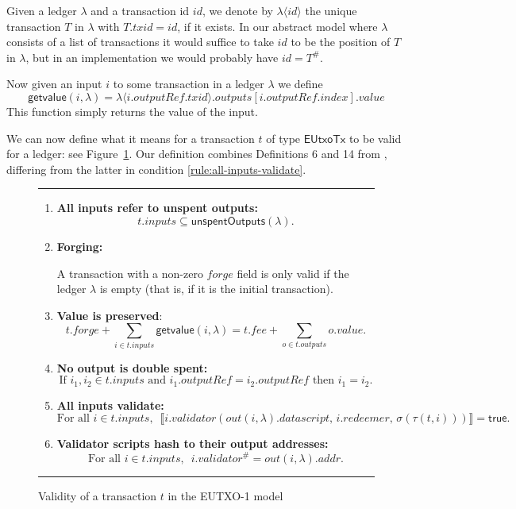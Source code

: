 \documentclass[a4paper]{article}
\newcounter{note}
\newcommand\rfskip{7pt}
\newenvironment{ruledfigure}[1]{\begin{figure}[#1]\hrule\vspace{\rfskip}}{\vspace{\rfskip}\hrule\end{figure}}
\newcommand{\true}{\textsf{true}}
\newcommand{\mi}[1]{\ensuremath{\mathit{#1}}}
\newcommand{\txid}{\mi{txid}}
\newcommand{\idx}{\mi{index}}
\newcommand{\inputs}{\mi{inputs}}
\newcommand{\outputs}{\mi{outputs}}
\newcommand{\forge}{\mi{forge}}
\newcommand{\fee}{\mi{fee}}
\newcommand{\addr}{\mi{addr}}
\newcommand{\val}{\mi{value}}  %
\newcommand{\validator}{\mi{validator}}
\newcommand{\redeemer}{\mi{redeemer}}
\newcommand{\datascript}{\mi{datascript}}
\newcommand{\outputref}{\mi{outputRef}}
\newcommand{\txout}{\mi{out}}
\newcommand{\id}{\mi{id}}
\newcommand{\getvalue}{\msf{getvalue}}
\newcommand{\msf}[1]{\ensuremath{\mathsf{#1}}}
\newcommand{\unspent}{\msf{unspentOutputs}}
\newcommand{\eutxotx}{\msf{EUtxoTx}}
\begin{document}
\medskip
\noindent Given a ledger $\lambda$ and a transaction id $\id$, we
denote by $\lambda\langle\id\rangle$ the unique transaction $T$ in
$\lambda$ with $T.\txid = \id$, if it exists. In our abstract model
where $\lambda$ consists of a list of transactions it would suffice to
take $id$ to be the position of $T$ in $\lambda$, but in an
implementation we would probably have $id = T^{\#}$.

\medskip
\noindent Now given an input $i$ to some transaction in a ledger
$\lambda$ we define
$$
\getvalue(i,\lambda) = \lambda\langle i.\outputref.\txid \rangle.\outputs[i.\outputref.\idx].\val
$$
This function simply returns the value of the input.



\bigskip

\noindent We can now define what it means for a transaction $t$ of type
$\eutxotx$ to be
valid for a ledger: see Figure~\ref{fig:eutxo-1-validity}.  Our
definition combines Definitions 6 and 14 from
\citep{Zahnentferner18-UTxO}, differing from the latter in condition
\ref{rule:all-inputs-validate}.


\begin{ruledfigure}{H}
\begin{enumerate}
    \item \label{rule:all-inputs-refer-to-unspent-outputs} \textbf{All
      inputs refer to unspent outputs:}
      \[
        t.\inputs \subseteq \unspent(\lambda).
      \]
    \item\label{rule:forging} \textbf{Forging:}
      \begin{center}
        \parbox{0.8\textwidth}{ A transaction with a non-zero \forge{}
          field is only valid if the ledger $\lambda$ is empty (that
          is, if it is the initial transaction).}
    \end{center}
      
    \item \label{rule:value-is-preserved} \textbf{Value is preserved}:
    \[
      t.\forge + \sum_{i \in t.\inputs} \getvalue(i, \lambda) = t.\fee + \sum_{o \in t.\outputs} o.\val.
    \]
    \item \label{rule:no-double-spending} \textbf{No output is double spent:}
    \[
     \textrm{If } i_1, i_2 \in t.\inputs \textrm{ and }  i_1.\mathit{outputRef} = i_2.\mathit{outputRef}
     \textrm{ then } i_1 = i_2.
    \]
    \item\label{rule:all-inputs-validate} \textbf{All inputs validate:}
    \[
    \textrm{For all } i \in t.\inputs,\enspace \llbracket
    i.\validator(\txout(i, \lambda).\datascript,\, i.\redeemer,\,  \sigma(\tau(t,i))) \rrbracket = \true.
      \]
    \item\label{rule:validator-scripts-hash} \textbf{Validator scripts hash to their output addresses:}
    \[
      \textrm{For all } i \in t.\inputs,\enspace i.\validator^{\#} = \txout(i, \lambda).\addr.
    \]
\end{enumerate}
\caption{Validity of a transaction $t$ in the EUTXO-1 model}
\label{fig:eutxo-1-validity}
\end{ruledfigure}
\end{document}
